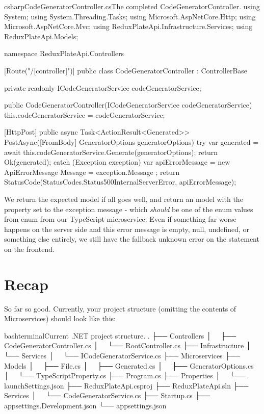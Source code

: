 \documentclass[paper=6in:9in,pagesize=pdftex,headinclude=on,footinclude=on,12pt,twoside]{scrbook}
\begin{document}
\begin{code}{csharp}{CodeGeneratorController.cs}{The completed CodeGeneratorController.}
using System;
using System.Threading.Tasks;
using Microsoft.AspNetCore.Http;
using Microsoft.AspNetCore.Mvc;
using ReduxPlateApi.Infrastructure.Services;
using ReduxPlateApi.Models;

namespace ReduxPlateApi.Controllers
{
    [Route("/[controller]")]
    public class CodeGeneratorController : ControllerBase
    {
        private readonly ICodeGeneratorService codeGeneratorService;

        public CodeGeneratorController(ICodeGeneratorService codeGeneratorService)
        {
            this.codeGeneratorService = codeGeneratorService;
        }

        [HttpPost]
        public async Task<ActionResult<Generated>> PostAsync([FromBody] GeneratorOptions generatorOptions)
        {
            try
            {
                var generated = await this.codeGeneratorService.Generate(generatorOptions);
                return Ok(generated);
            } catch (Exception exception)
            {
                var apiErrorMessage = new ApiErrorMessage
                {
                    Message = exception.Message
                };
                return StatusCode(StatusCodes.Status500InternalServerError, apiErrorMessage);
            }
        }
    }
}  
\end{code}

We return the expected  model if all goes well, and return an  model with the  property set to the exception message - which \textit{should} be one of the enum values from  enum from our TypeScript microservice. Even if something far worse happens on the server side and this error message is empty, null, undefined, or something else entirely, we still have the fallback unknown error on the  statement on the frontend.

\section{Recap}

So far so good. Currently, your project structure (omitting the contents of Microservices) should look like this:

\begin{code}{bash}{terminal}{Current .NET project structure.}
.
├── Controllers
│   ├── CodeGeneratorController.cs
│   └── RootController.cs
├── Infrastructure
│   └── Services
│       └── ICodeGeneratorService.cs
├── Microservices
├── Models
│   ├── File.cs
│   ├── Generated.cs
│   ├── GeneratorOptions.cs
│   └── TypeScriptProperty.cs
├── Program.cs
├── Properties
│   └── launchSettings.json
├── ReduxPlateApi.csproj
├── ReduxPlateApi.sln
├── Services
│   └── CodeGeneratorService.cs
├── Startup.cs
├── appsettings.Development.json
└── appsettings.json
\end{code}
\end{document}
